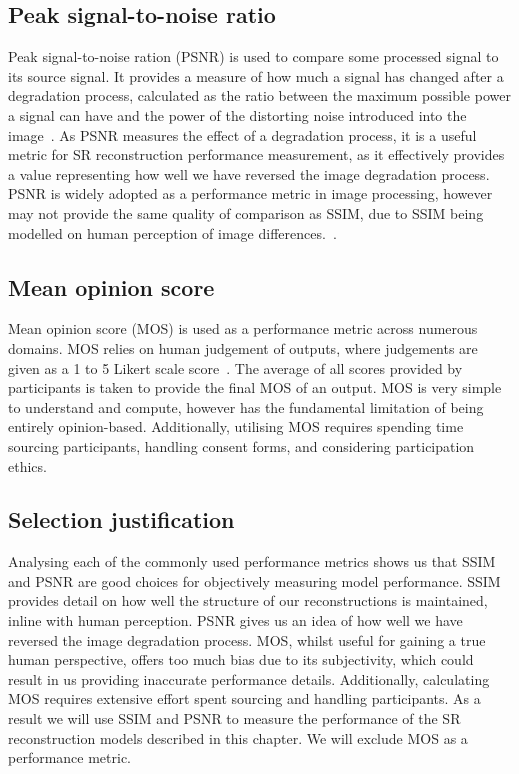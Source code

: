 \subsection{Peak signal-to-noise ratio}
Peak signal-to-noise ration (PSNR) is used to compare some processed signal to its source signal. It provides a measure of how much a signal has changed after a degradation process, calculated as the ratio between the maximum possible power a signal can have and the power of the distorting noise introduced into the image~\cite{psnr}. As PSNR measures the effect of a degradation process, it is a useful metric for SR reconstruction performance measurement, as it effectively provides a value representing how well we have reversed the image degradation process. PSNR is widely adopted as a performance metric in image processing, however may not provide the same quality of comparison as SSIM, due to SSIM being modelled on human perception of image differences.~\cite{psnrAnalysis}.

\subsection{Mean opinion score}
Mean opinion score (MOS) is used as a performance metric across numerous domains. MOS relies on human judgement of outputs, where judgements are given as a 1 to 5 Likert scale score~\cite{srgan}. The average of all scores provided by participants is taken to provide the final MOS of an output. MOS is very simple to understand and compute, however has the fundamental limitation of being entirely opinion-based. Additionally, utilising MOS requires spending time sourcing participants, handling consent forms, and considering participation ethics.

\subsection{Selection justification}
Analysing each of the commonly used performance metrics shows us that SSIM and PSNR are good choices for objectively measuring model performance. SSIM provides detail on how well the structure of our reconstructions is maintained, inline with human perception. PSNR gives us an idea of how well we have reversed the image degradation process. MOS, whilst useful for gaining a true human perspective, offers too much bias due to its subjectivity, which could result in us providing inaccurate performance details. Additionally, calculating MOS requires extensive effort spent sourcing and handling participants. As a result we will use SSIM and PSNR to measure the performance of the SR reconstruction models described in this chapter. We will exclude MOS as a performance metric.
